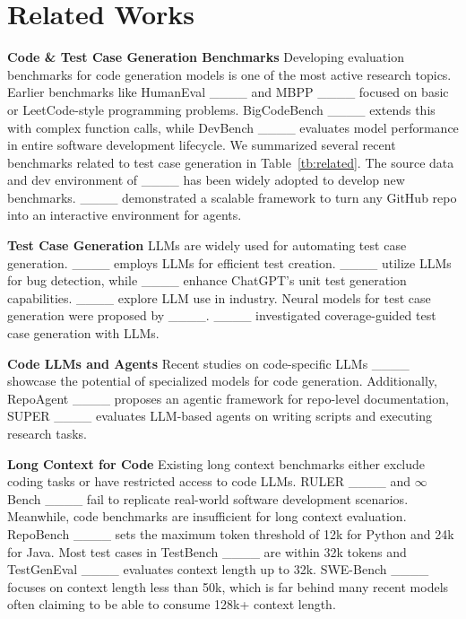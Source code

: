 \section{Related Works}
\textbf{Code \& Test Case Generation Benchmarks}\quad
\iffalse The development of benchmarks for evaluating code generation models has been active. \fi Developing evaluation benchmarks for code generation models is one of the most active research topics.
Earlier benchmarks like HumanEval ____ and MBPP ____ focused on basic or LeetCode-style programming problems. BigCodeBench ____ extends this with complex function calls, while DevBench ____ evaluates model performance in entire software development lifecycle. 
We summarized several recent benchmarks related to test case generation in Table~\ref{tb:related}. The source data and dev environment of ____ has been widely adopted to develop new benchmarks. ____ demonstrated a scalable framework to turn any GitHub repo into an interactive environment for agents.


\textbf{Test Case Generation}\quad
LLMs are widely used for automating test case generation. ____ employs LLMs for efficient test creation. ____ utilize LLMs for bug detection, while ____ enhance ChatGPT's unit test generation capabilities. ____ explore LLM use in industry. Neural models for test case generation were proposed by ____. ____ investigated coverage-guided test case generation with LLMs.

\textbf{Code LLMs and Agents}\quad
Recent studies on code-specific LLMs ____ showcase the potential of specialized models for code generation. \iffalse The StarCoder 2 ____ and open code models based on GEMMA ____ show the evolution of LLMs tailored for programming tasks. \fi Additionally, RepoAgent ____ proposes an agentic framework for repo-level documentation, SUPER ____ evaluates LLM-based agents on writing scripts and executing research tasks.

\textbf{Long Context for Code}\quad
Existing long context benchmarks either exclude coding tasks or have restricted access to code LLMs. RULER ____ and $\infty$Bench ____ fail to replicate real-world software development scenarios. Meanwhile, code benchmarks are insufficient for long context evaluation. RepoBench ____ sets the maximum token threshold of 12k for Python and 24k for Java. Most test cases in TestBench ____ are within 32k tokens and TestGenEval ____ evaluates context length up to 32k. SWE-Bench ____ focuses on context length less than 50k, which is far behind many recent models often claiming to be able to consume 128k+ context length.




